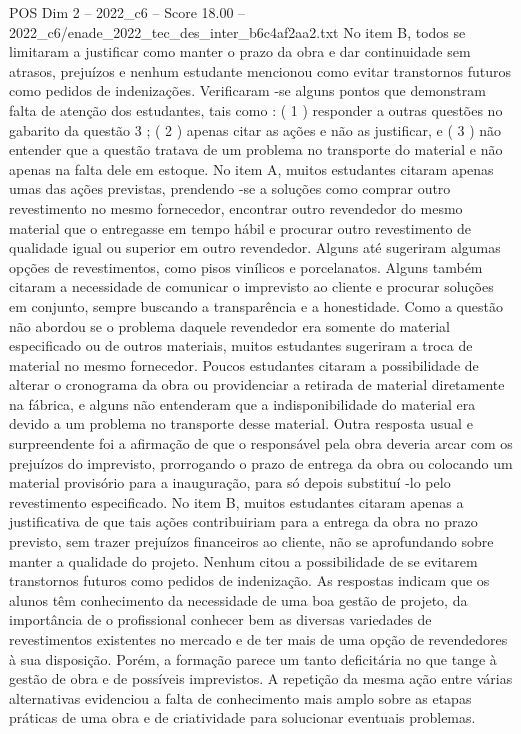 \begin{textsample}{POS Dim 2 – 2022\_c6 – Score 18.00 – 2022\_c6/enade\_2022\_tec\_des\_inter\_b6c4af2aa2.txt}
No item B, todos se limitaram a justificar como manter o prazo da obra e dar continuidade sem atrasos, prejuízos e nenhum estudante mencionou como evitar transtornos futuros como pedidos de indenizações.
Verificaram -se alguns pontos que demonstram falta de atenção dos estudantes, tais como : ( 1 ) responder a outras questões no gabarito da questão 3 ; ( 2 ) apenas citar as ações e não as justificar, e ( 3 ) não entender que a questão tratava de um problema no transporte do material e não apenas na falta dele em estoque.
No item A, muitos estudantes citaram apenas umas das ações previstas, prendendo -se a soluções como comprar outro revestimento no mesmo fornecedor, encontrar outro revendedor do mesmo material que o entregasse em tempo hábil e procurar outro revestimento de qualidade igual ou superior em outro revendedor.
Alguns até sugeriram algumas opções de revestimentos, como pisos vinílicos e porcelanatos.
Alguns também citaram a necessidade de comunicar o imprevisto ao cliente e procurar soluções em conjunto, sempre buscando a transparência e a honestidade.
Como a questão não abordou se o problema daquele revendedor era somente do material especificado ou de outros materiais, muitos estudantes sugeriram a troca de material no mesmo fornecedor.
Poucos estudantes citaram a possibilidade de alterar o cronograma da obra ou providenciar a retirada de material diretamente na fábrica, e alguns não entenderam que a indisponibilidade do material era devido a um problema no transporte desse material.
Outra resposta usual e surpreendente foi a afirmação de que o responsável pela obra deveria arcar com os prejuízos do imprevisto, prorrogando o prazo de entrega da obra ou colocando um material provisório para a inauguração, para só depois substituí -lo pelo revestimento especificado.
No item B, muitos estudantes citaram apenas a justificativa de que tais ações contribuiriam para a entrega da obra no prazo previsto, sem trazer prejuízos financeiros ao cliente, não se aprofundando sobre manter a qualidade do projeto.
Nenhum citou a possibilidade de se evitarem transtornos futuros como pedidos de indenização.
As respostas indicam que os alunos têm conhecimento da necessidade de uma boa gestão de projeto, da importância de o profissional conhecer bem as diversas variedades de revestimentos existentes no mercado e de ter mais de uma opção de revendedores à sua disposição.
Porém, a formação parece um tanto deficitária no que tange à gestão de obra e de possíveis imprevistos.
A repetição da mesma ação entre várias alternativas evidenciou a falta de conhecimento mais amplo sobre as etapas práticas de uma obra e de criatividade para solucionar eventuais problemas.

\end{textsample}
